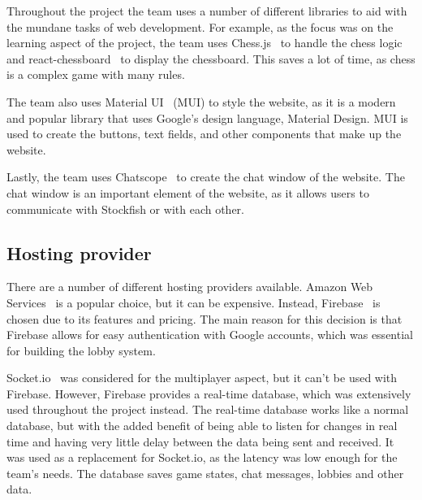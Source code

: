 Throughout the project the team uses a number of different libraries to aid with the mundane tasks of web development.
For example, as the focus was on the learning aspect of the project, the team uses Chess.js~\cite{chess.js} to handle
the chess logic and react-chessboard~\cite{react-chessboard} to display the chessboard.
This saves a lot of time, as chess is a complex game with many rules.

The team also uses Material UI~\cite{mui} (MUI) to style the website, as it is a modern and popular library that
uses Google's design language, Material Design.
MUI is used to create the buttons, text fields, and other components that make up the website.

Lastly, the team uses Chatscope~\cite{chatscope} to create the chat window of the website.
The chat window is an important element of the website, as it allows users to communicate with Stockfish or with each
other.

\subsection{Hosting provider}\label{subsec:hosting}

There are a number of different hosting providers available.
Amazon Web Services~\cite{aws} is a popular choice, but it can be expensive.
Instead, Firebase~\cite{firebase} is chosen due to its features and pricing.
The main reason for this decision is that Firebase allows for easy authentication with Google accounts, which was
essential for building the lobby system.

Socket.io~\cite{socket.io} was considered for the multiplayer aspect, but it can't be used with Firebase.
However, Firebase provides a real-time database, which was extensively used throughout the project instead.
The real-time database works like a normal database, but with the added benefit of being able to listen for changes in
real time and having very little delay between the data being sent and received.
It was used as a replacement for Socket.io, as the latency was low enough for the team's needs.
The database saves game states, chat messages, lobbies and other data.
